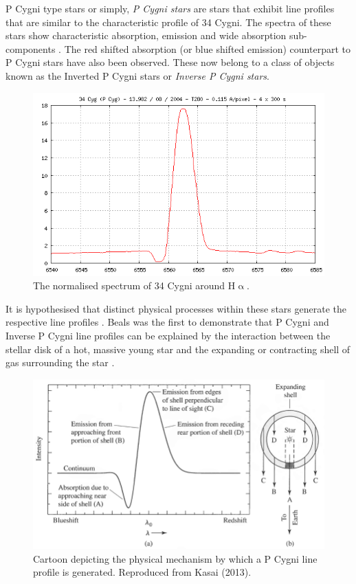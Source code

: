 P Cygni type stars or simply, \emph{P Cygni stars} are stars that exhibit line profiles that are similar to the characteristic profile of 34 Cygni. The spectra of these stars show characteristic absorption, emission and wide absorption sub-components \cite{zhang2021catalog}. The red shifted absorption (or blue shifted emission) counterpart to P Cygni stars have also been observed. These now belong to a class of objects known as the Inverted P Cygni stars or \emph{Inverse P Cygni stars}. 

\begin{figure}[!htb]
\centering
\includegraphics[scale=.40]{figures/34cygni.png}
\caption{The normalised spectrum of 34 Cygni around H$\upalpha$.}
\end{figure}

It is hypothesised that distinct physical processes within these stars generate the respective line profiles \cite{hou2016catalog}. Beals was the first to demonstrate that P Cygni and Inverse P Cygni line profiles can be explained by the interaction between the stellar disk of a hot, massive young star and the expanding or contracting shell of gas surrounding the star \cite{1953PDAO....9....1B}. 

\begin{figure}[!htb]
\centering
\includegraphics[scale=.40]{figures/expandingpcygni.png}
\caption{Cartoon depicting the physical mechanism by which a P Cygni line profile is generated. Reproduced from Kasai (2013)\cite{kasai2013type}.}
\end{figure}

